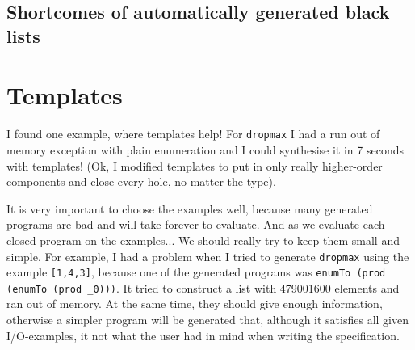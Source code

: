   \subsection{Shortcomes of automatically generated black lists}

\section{Templates}
I found one example, where templates help! For \lstinline?dropmax? I had a run out of memory exception with plain enumeration and I could synthesise it in 7 seconds with templates!
(Ok, I modified templates to put in only really higher-order components and close every hole, no matter the type).

It is very important to choose the examples well, because many generated programs are bad and will take forever to evaluate. And as we evaluate each closed program on the examples... We should really try to keep them small and simple.
For example, I had a problem when I tried to generate \lstinline?dropmax? using the example \lstinline?[1,4,3]?, because one of the generated programs was \lstinline?enumTo (prod (enumTo (prod _0)))?. It tried to construct a list with 479001600 elements and ran out of memory.
At the same time, they should give enough information, otherwise a simpler program will be generated that, although it satisfies all given I/O-examples, it not what the user had in mind when writing the specification.

